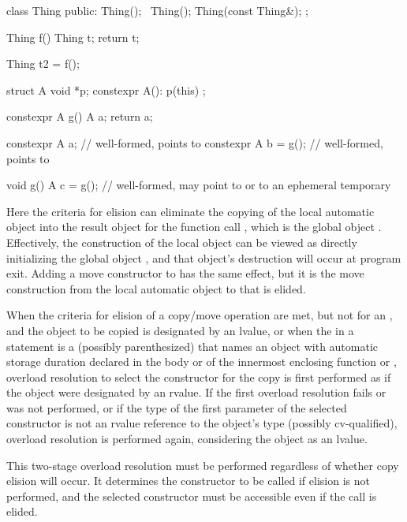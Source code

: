\begin{example}

\begin{codeblock}
class Thing {
public:
  Thing();
  ~Thing();
  Thing(const Thing&);
};

Thing f() {
  Thing t;
  return t;
}

Thing t2 = f();

struct A {
  void *p;
  constexpr A(): p(this) {}
};

constexpr A g() {
  A a;
  return a;
}

constexpr A a;        // well-formed,  points to 
constexpr A b = g();  // well-formed,  points to 

void g() {
  A c = g();          // well-formed,  may point to  or to an ephemeral temporary
}
\end{codeblock}

Here the criteria for elision can
eliminate
the copying of the local automatic object
into the result object for the function call
,
which is the global object
.
Effectively, the construction of the local object
can be viewed as directly initializing the global
object
,
and that object's destruction will occur at program
exit.
Adding a move constructor to  has the same effect, but it is the
move construction from the local automatic object to  that is elided.
\end{example}

\pnum
When the criteria for elision of a copy/move operation are met,
but not for an ,
and the object
to be copied is designated by an lvalue,
or when the  in a  statement
is a (possibly parenthesized) 
that names an object with automatic storage duration declared in the body
or  of the innermost enclosing
function or ,
overload resolution to select the constructor
for the copy is first performed as if the object were designated by an rvalue.
If the first overload resolution fails or was not performed,
or if the type of the first parameter of the selected
constructor is not an rvalue reference to the object's type (possibly cv-qualified),
overload resolution is performed again, considering the object as an lvalue.
\begin{note} This two-stage overload resolution must be performed regardless
of whether copy elision will occur. It determines the constructor to be called if
elision is not performed, and the selected constructor must be accessible even if
the call is elided. \end{note}

